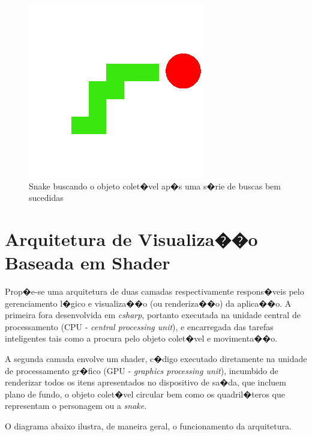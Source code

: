\documentclass[12pt]{article}
\begin{document}
\begin{figure}[H]
\centering
\includegraphics[scale=0.7]{VRSnakePicture}
\caption{Snake buscando o objeto colet�vel ap�s uma s�rie de buscas bem sucedidas}
\label{fig:VRSnakePicture}
\end{figure}

\section{Arquitetura de Visualiza��o Baseada em Shader} \label{sec:architecture}
Prop�e-se uma arquitetura de duas camadas respectivamente respons�veis pelo gerenciamento l�gico e visualiza��o (ou renderiza��o) da aplica��o. A primeira fora desenvolvida em \textit{csharp}, portanto executada na unidade central de processamento (CPU - \textit{central processing unit}), e encarregada das tarefas inteligentes tais como a procura pelo objeto colet�vel e movimenta��o. 

A segunda camada envolve um shader, c�digo executado diretamente na unidade de processamento gr�fico (GPU - \textit{graphics processing unit}), incumbido de renderizar todos os itens apresentados no dispositivo de sa�da, que incluem plano de fundo, o objeto colet�vel circular bem como os quadril�teros que representam o personagem ou a \textit{snake}. 

O diagrama abaixo ilustra, de maneira geral, o funcionamento da arquitetura. 
\end{document}
